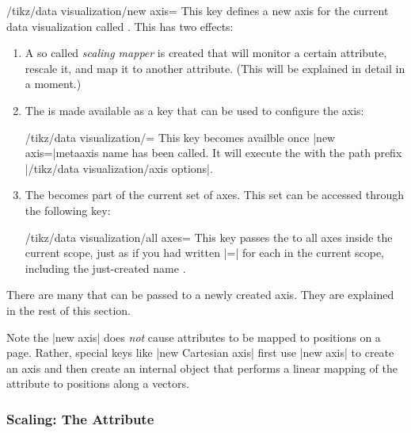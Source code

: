 \begin{key}{/tikz/data visualization/new axis=}
  This key defines a new axis for the current data visualization
  called . This has two effects:
  \begin{enumerate}
  \item A so called \emph{scaling mapper} is created that will monitor
    a certain attribute, rescale it, and map it to another
    attribute. (This will be explained in detail in a moment.)
  \item The  is made available as a key that can be
    used to configure the axis:
    \begin{key}{/tikz/data visualization/=}
      This key becomes availble once |new axis=|meta{axis name} has
      been called. It will execute the  with the path
      prefix |/tikz/data visualization/axis options|.
\begin{codeexample}
\end{codeexample}
    \end{key}
  \item The  becomes part of the current set of
    axes. This set can be accessed through the following key:
    \begin{key}{/tikz/data visualization/all axes=}
      This key passes the  to all axes inside the
      current scope, just as if you had written |=| for each  in the
      current scope, including the just-created name .
    \end{key}
  \end{enumerate}
  There are many  that can be passed to a newly created
  axis. They are explained in the rest of this section.
\end{key}

Note the |new axis| does \emph{not} cause attributes to be mapped to
positions on a page. Rather, special keys like |new Cartesian axis|
first use |new axis| to create an axis and then create an internal
object that performs a linear mapping of the attribute to 
positions along a vectors.


\subsubsection{Scaling: The Attribute}

